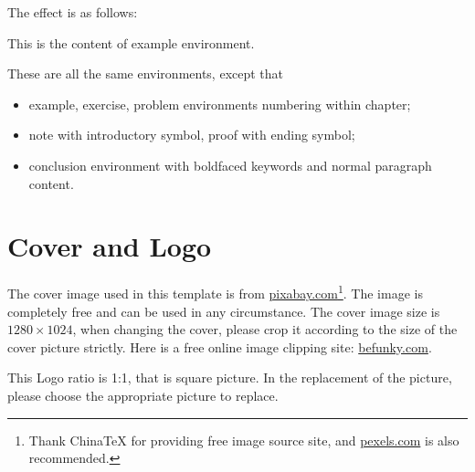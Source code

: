 \documentclass[noanswer,fancy,blue,11pt]{elegantbook}
\begin{document}
The effect is as follows:

\begin{example}
This is the content of example environment.
\end{example}

These are all the same environments, except that

\begin{itemize}
   \item example, exercise, problem environments numbering within chapter;
   \item note with introductory symbol, proof with ending symbol;
   \item conclusion environment with boldfaced keywords and normal paragraph content.
\end{itemize}


\section{Cover and Logo}

The cover image used in this template is from \href{https://pixabay.com/en/tea-time-poetry-coffee-reading-3240766/}{pixabay.com}\footnote{Thank China\TeX{} for providing free image source site, and \href{https://www.pexels.com/}{pexels.com} is also recommended.}. The image is completely free and can be used in any circumstance. The cover image size is $1280 \times 1024$, when changing the cover, please crop it according to the size of the cover picture strictly. Here is a free online image clipping site: \href{https://www.befunky.com/create/crop-photo/}{befunky.com}.

This Logo ratio is 1:1, that is square picture. In the replacement of the picture, please choose the appropriate picture to replace.
\end{document}
